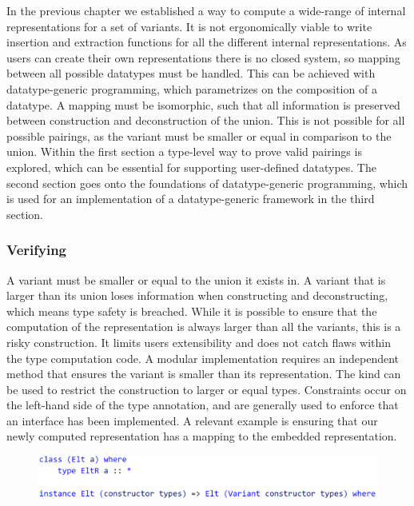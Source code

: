 \documentclass{article}
\newcommand{\type}[1]{\smash{\colorbox{codegray}{\texttt{#1}}}}
\begin{document}
In the previous chapter we established a way to compute a wide-range of internal representations for a set of variants.
It is not ergonomically viable to write insertion and extraction functions for all the different internal representations. 
As users can create their own representations there is no closed system, so mapping between all possible datatypes must be handled.
This can be achieved with datatype-generic programming, which parametrizes on the composition of a datatype\cite{datatype-generic-programming}. 
A mapping must be isomorphic, such that all information is preserved between construction and deconstruction of the union.
This is not possible for all possible pairings, as the variant must be smaller or equal in comparison to the union.
Within the first section a type-level way to prove valid pairings is explored, which can be essential for supporting user-defined datatypes.
The second section goes onto the foundations of datatype-generic programming, which is used for an implementation of a datatype-generic framework in the third section.

\subsubsection{Verifying}

A variant must be smaller or equal to the union it exists in.
A variant that is larger than its union loses information when constructing and deconstructing, which means type safety is breached.
While it is possible to ensure that the computation of the representation is always larger than all the variants, this is a risky construction.
It limits users extensibility and does not catch flaws within the type computation code. 
A modular implementation requires an independent method that ensures the variant is smaller than its representation.
The \type{Constraint} kind can be used to restrict the construction to larger or equal types.
Constraints occur on the left-hand side of the type annotation, and are generally used to enforce that an interface has been implemented.
A relevant example is ensuring that our newly computed representation has a mapping to the embedded representation.

\begin{figure}[hbt!]
    \hspace{1em}
    \includegraphics[scale=0.4]{CodeType14.png}
\end{figure}
\end{document}
